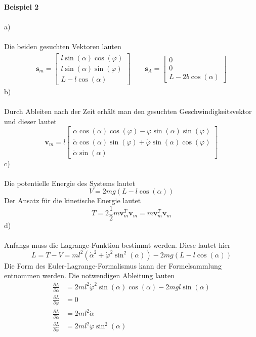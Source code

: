 \textbf{Beispiel 2}\\ \\
a)\\ \\
Die beiden gesuchten Vektoren lauten
\begin{align*}
	\textbf{s}_m = \begin{bmatrix}
		l\sin(\alpha)\cos(\varphi) \\
		l\sin(\alpha)\sin(\varphi) \\
		L - l\cos(\alpha)
	\end{bmatrix}
	\qquad
	\textbf{s}_A = \begin{bmatrix}
		0 \\
		0 \\
		L - 2b\cos(\alpha)
	\end{bmatrix}
\end{align*}
b)\\ \\
Durch Ableiten nach der Zeit erhält man den gesuchten Geschwindigkeitsvektor und dieser lautet
\[
	\textbf{v}_m = l \begin{bmatrix}
			\dot{\alpha}\cos(\alpha)\cos(\varphi) - \dot{\varphi}\sin(\alpha)\sin(\varphi) \\
			\dot{\alpha}\cos(\alpha)\sin(\varphi) + \dot{\varphi}\sin(\alpha)\cos(\varphi) \\
			\dot{\alpha}\sin(\alpha)
	\end{bmatrix}
\]
\newpage
\noindent
c)\\ \\
Die potentielle Energie des Systems lautet
\[
	V = 2 m g (L - l\cos(\alpha))
\]
Der Ansatz für die kinetische Energie lautet
\[
	T = 2 \frac{1}{2} m \textbf{v}_m^T\textbf{v}_m = m \textbf{v}_m^T\textbf{v}_m
\]
d)\\ \\
Anfangs muss die Lagrange-Funktion bestimmt werden. Diese lautet hier
\[
	L = T - V = ml^2\left(\dot{\alpha}^2 + \dot{\varphi}^2\sin^2(\alpha)\right) - 2 m g (L - l\cos(\alpha))
\]
Die Form des Euler-Lagrange-Formalismus kann der Formelsammlung entnommen werden. Die notwendigen Ableitung lauten
\begin{align*}
	\frac{\partial L}{\partial \alpha} &= 2ml^2\dot{\varphi}^2\sin(\alpha)\cos(\alpha) - 2mgl\sin(\alpha) \\
	\frac{\partial L}{\partial \varphi} &= 0 \\
	\frac{\partial L}{\partial \dot{\alpha}} &= 2ml^2\dot{\alpha} \\
	\frac{\partial L}{\partial \dot{\varphi}} &= 2ml^2\dot{\varphi}\sin^2(\alpha)
\end{align*}
